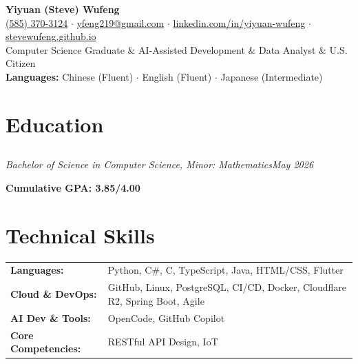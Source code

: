 \documentclass[11pt]{article}
\begin{document}
\begin{center}
  {\LARGE\textbf{Yiyuan (Steve) Wufeng}}\\[0.2em]
  \href{tel:+15853703124}{{\small (585) 370-3124}} $\cdot$
  \href{mailto:yfeng219@gmail.com}{{\small yfeng219@gmail.com}} $\cdot$
  \href{https://linkedin.com/in/yiyuan-wufeng/}{{\small linkedin.com/in/yiyuan-wufeng}} $\cdot$
  \href{https://stevewufeng.github.io}{{\small stevewufeng.github.io}}\\[0.05em]
  {\small Computer Science Graduate \& AI-Assisted Development \& Data Analyst \& U.S. Citizen}\\[0.05em]
  {\small \textbf{Languages:} Chinese (Fluent) $\cdot$ English (Fluent) $\cdot$ Japanese (Intermediate)}\\[0.05em]
\end{center}

\section{Education}
\subsection{\texorpdfstring{}{Rochester Institute of Technology}}
\textit{Bachelor of Science in Computer Science, Minor: Mathematics}\hfill\textit{May 2026}\par
\vspace{-1.0em}
\textbf{Cumulative GPA: 3.85/4.00}\par

\section{Technical Skills}
\begin{tabular}{@{}p{4.5cm}@{}p{\dimexpr\textwidth-4.5cm\relax}@{}}
\textbf{Languages:}           & Python, C\#, C, TypeScript, Java, HTML/CSS, Flutter \\
\textbf{Cloud \& DevOps:}     & GitHub, Linux, PostgreSQL, CI/CD, Docker, Cloudflare R2, Spring Boot, Agile \\
\textbf{AI Dev \& Tools:}     & OpenCode, GitHub Copilot \\
\textbf{Core Competencies:}   & RESTful API Design, IoT \\
\end{tabular}

\end{document}
